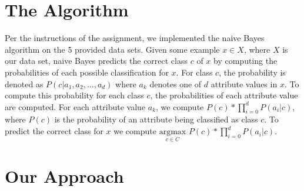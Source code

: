 \documentclass[twoside,11pt]{article}
\begin{document}
\section{The Algorithm}
Per the instructions of the assignment, we implemented the naive Bayes algorithm on the 5 provided data sets. Given some example $x \in X$, where $X$ is our data set, naive Bayes predicts the correct class $c$ of $x$ by computing the probabilities of each possible classification for $x$. For class $c$, the probability is denoted as $P(c | a_1, a_2,...,a_d)$ where $a_k$ denotes one of $d$ attribute values in $x$. To compute this probability for each class $c$, the probabilities of each attribute value are computed. For each attribute value $a_k$, we compute $P(c) * \prod^d_{i=0} P(a_i | c)$, where $P(c)$ is the probability of an attribute being classified as class $c$. To predict the correct class for $x$ we compute $\underset{c \in C}{\mathrm{argmax}}$ $P(c) * \prod^d_{i=0} P(a_i | c)$.

\section{Our Approach}
\end{document}
